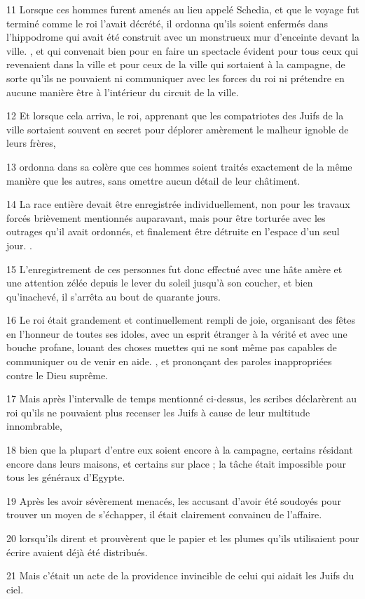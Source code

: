 \par 11 Lorsque ces hommes furent amenés au lieu appelé Schedia, et que le voyage fut terminé comme le roi l'avait décrété, il ordonna qu'ils soient enfermés dans l'hippodrome qui avait été construit avec un monstrueux mur d'enceinte devant la ville. , et qui convenait bien pour en faire un spectacle évident pour tous ceux qui revenaient dans la ville et pour ceux de la ville qui sortaient à la campagne, de sorte qu'ils ne pouvaient ni communiquer avec les forces du roi ni prétendre en aucune manière être à l'intérieur du circuit de la ville.
\par 12 Et lorsque cela arriva, le roi, apprenant que les compatriotes des Juifs de la ville sortaient souvent en secret pour déplorer amèrement le malheur ignoble de leurs frères,
\par 13 ordonna dans sa colère que ces hommes soient traités exactement de la même manière que les autres, sans omettre aucun détail de leur châtiment.
\par 14 La race entière devait être enregistrée individuellement, non pour les travaux forcés brièvement mentionnés auparavant, mais pour être torturée avec les outrages qu'il avait ordonnés, et finalement être détruite en l'espace d'un seul jour. .
\par 15 L'enregistrement de ces personnes fut donc effectué avec une hâte amère et une attention zélée depuis le lever du soleil jusqu'à son coucher, et bien qu'inachevé, il s'arrêta au bout de quarante jours.
\par 16 Le roi était grandement et continuellement rempli de joie, organisant des fêtes en l'honneur de toutes ses idoles, avec un esprit étranger à la vérité et avec une bouche profane, louant des choses muettes qui ne sont même pas capables de communiquer ou de venir en aide. , et prononçant des paroles inappropriées contre le Dieu suprême.
\par 17 Mais après l'intervalle de temps mentionné ci-dessus, les scribes déclarèrent au roi qu'ils ne pouvaient plus recenser les Juifs à cause de leur multitude innombrable,
\par 18 bien que la plupart d'entre eux soient encore à la campagne, certains résidant encore dans leurs maisons, et certains sur place ; la tâche était impossible pour tous les généraux d'Egypte.
\par 19 Après les avoir sévèrement menacés, les accusant d'avoir été soudoyés pour trouver un moyen de s'échapper, il était clairement convaincu de l'affaire.
\par 20 lorsqu'ils dirent et prouvèrent que le papier et les plumes qu'ils utilisaient pour écrire avaient déjà été distribués.
\par 21 Mais c'était un acte de la providence invincible de celui qui aidait les Juifs du ciel.

